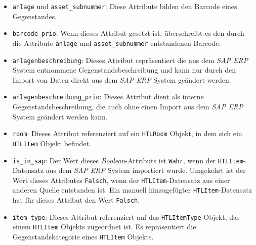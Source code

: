 \begin{itemize}
\tightlist
\item
  \texttt{anlage} und \texttt{asset\_subnummer}: Diese Attribute bilden
  den Barcode eines Gegenstandes.
\item
  \texttt{barcode\_prio}: Wenn dieses Attribut gesetzt ist, überschreibt
  es den durch die Attribute \texttt{anlage} und
  \texttt{asset\_subnummer} entstandenen Barcode.
\item
  \texttt{anlagenbeschreibung}: Dieses Attribut repräsentiert die aus
  dem \emph{SAP ERP}
  System entnommene Gegenstandsbeschreibung und kann nur durch den
  Import von Daten direkt aus dem \emph{SAP ERP}
  System geändert werden.
\item
  \texttt{anlagenbeschreibung\_prio}: Dieses Attribut dient als interne
  Gegenstandsbeschreibung, die auch ohne einen Import aus dem
  \emph{SAP ERP}
  System geändert werden kann.
\item
  \texttt{room}: Dieses Attribut referenziert auf ein \texttt{HTLRoom}
  Objekt, in dem sich ein \texttt{HTLItem} Objekt befindet.
\item
  \texttt{is\_in\_sap}: Der Wert dieses
  \emph{Boolean}-Attributs
  ist \texttt{Wahr}, wenn der \texttt{HTLItem}-Datensatz aus dem
  \emph{SAP ERP}
  System importiert wurde. Umgekehrt ist der Wert dieses Attributes
  \texttt{Falsch}, wenn der \texttt{HTLItem}-Datensatz aus einer anderen
  Quelle entstanden ist. Ein manuell hinzugefügter
  \texttt{HTLItem}-Datensatz hat für dieses Attribut den Wert
  \texttt{Falsch}.
\item
  \texttt{item\_type}: Dieses Attribut referenziert auf das
  \texttt{HTLItemType} Objekt, das einem \texttt{HTLItem} Objekts
  zugeordnet ist. Es repräsentiert die Gegenstandskategorie eines
  \texttt{HTLItem} Objekts.
\end{itemize}

